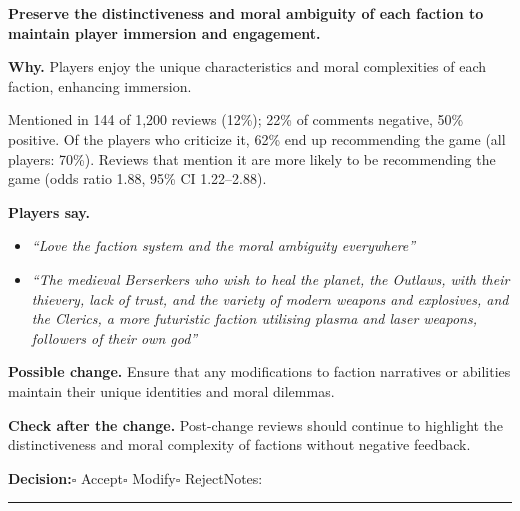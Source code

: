 \documentclass[10pt]{article}
\begin{document}
\begin{tcolorbox}[colback=white,colframe=gP,colbacktitle=lP,coltitle=black,title={\textbf{P3}\quad Factions and Lore\hfill\textcolor{gP}{\textbf{Protect}}},boxrule=0.8pt,arc=2pt,left=6pt,right=6pt,top=4pt,bottom=4pt,before skip=8pt,after skip=8pt]
{\large\textbf{Preserve the distinctiveness and moral ambiguity of each faction to maintain player immersion and engagement.}}

\smallskip
\textbf{Why.} Players enjoy the unique characteristics and moral complexities of each faction, enhancing immersion.

\smallskip
{\small Mentioned in 144 of 1,200 reviews (12\%); 22\% of comments negative, 50\% positive. Of the players who criticize it, 62\% end up recommending the game (all players: 70\%). Reviews that mention it are more likely to be recommending the game {\color{ink2}\footnotesize(odds ratio 1.88, 95\% CI 1.22--2.88)}.}

\smallskip
\textbf{Players say.}
\begin{itemize}[leftmargin=12pt,itemsep=1pt,topsep=2pt]
    \item \textit{``Love the faction system and the moral ambiguity everywhere''}
    \item \textit{``The medieval Berserkers who wish to heal the planet, the Outlaws, with their thievery, lack of trust, and the variety of modern weapons and explosives, and the Clerics, a more futuristic faction utilising plasma and laser weapons, followers of their own god''}
\end{itemize}
\textbf{Possible change.} Ensure that any modifications to faction narratives or abilities maintain their unique identities and moral dilemmas.

\smallskip
\textbf{Check after the change.} Post-change reviews should continue to highlight the distinctiveness and moral complexity of factions without negative feedback.

\medskip
{\small\textbf{Decision:}\quad $\square$ Accept\quad $\square$ Modify\quad $\square$ Reject\qquad Notes: \rule{0.38\linewidth}{0.4pt}}
\end{tcolorbox}
\end{document}
